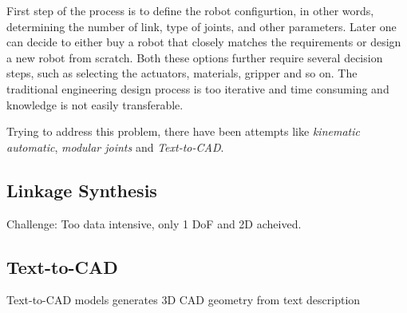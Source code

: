 



First step of the process is to define the robot configurtion, in other words, determining the number of link, type of joints, and other parameters. Later one can decide to either buy a robot that closely matches the requirements or design a new robot from scratch. Both these options further require several decision steps, such as selecting the actuators, materials, gripper and so on.
The traditional engineering design process is too iterative and time consuming and knowledge is not easily transferable. 
    
Trying to address this problem, there have been attempts like \textit{kinematic automatic}, \textit{modular joints} and \textit{Text-to-CAD}.


\subsection{Linkage Synthesis}


Challenge: Too data intensive, only 1 DoF and 2D acheived. 


\subsection{Text-to-CAD}
Text-to-CAD models generates 3D CAD geometry from text description



